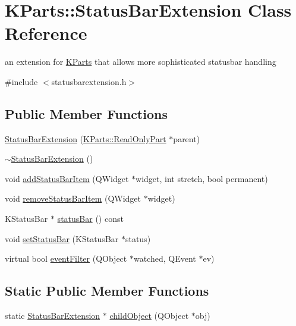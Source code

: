 \hypertarget{classKParts_1_1StatusBarExtension}{\section{\-K\-Parts\-:\-:\-Status\-Bar\-Extension \-Class \-Reference}
\label{classKParts_1_1StatusBarExtension}
}


an extension for \hyperlink{namespaceKParts}{\-K\-Parts} that allows more sophisticated statusbar handling  




{\ttfamily \#include $<$statusbarextension.\-h$>$}

\subsection*{\-Public \-Member \-Functions}
\begin{DoxyCompactItemize}
\item 
\hyperlink{classKParts_1_1StatusBarExtension_a0130c3d5e970d44be6e1543cd5ae7324}{\-Status\-Bar\-Extension} (\hyperlink{classKParts_1_1ReadOnlyPart}{\-K\-Parts\-::\-Read\-Only\-Part} $\ast$parent)
\item 
\hyperlink{classKParts_1_1StatusBarExtension_a47bc9c8acae9b46bfa04ea0297e80bd8}{$\sim$\-Status\-Bar\-Extension} ()
\item 
void \hyperlink{classKParts_1_1StatusBarExtension_aaa7efe1d1a03b9d613c5bb8cbb6691d4}{add\-Status\-Bar\-Item} (\-Q\-Widget $\ast$widget, int stretch, bool permanent)
\item 
void \hyperlink{classKParts_1_1StatusBarExtension_adaef7e1acbb9373168ae531e0792ab6e}{remove\-Status\-Bar\-Item} (\-Q\-Widget $\ast$widget)
\item 
\-K\-Status\-Bar $\ast$ \hyperlink{classKParts_1_1StatusBarExtension_a561eaf86df9e40f4217d0cfed58d92bb}{status\-Bar} () const 
\item 
void \hyperlink{classKParts_1_1StatusBarExtension_a6e3e3e8969ec67285ef7749f6c9caa85}{set\-Status\-Bar} (\-K\-Status\-Bar $\ast$status)
\item 
virtual bool \hyperlink{classKParts_1_1StatusBarExtension_a05a310b221e20aa0ba60156be82a37ef}{event\-Filter} (\-Q\-Object $\ast$watched, \-Q\-Event $\ast$ev)
\end{DoxyCompactItemize}
\subsection*{\-Static \-Public \-Member \-Functions}
\begin{DoxyCompactItemize}
\item 
static \hyperlink{classKParts_1_1StatusBarExtension}{\-Status\-Bar\-Extension} $\ast$ \hyperlink{classKParts_1_1StatusBarExtension_a69c6c7a09941dd6c70b315a4c21f3f20}{child\-Object} (\-Q\-Object $\ast$obj)
\end{DoxyCompactItemize}
